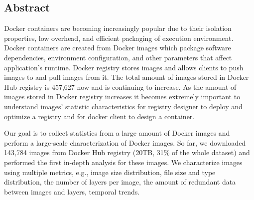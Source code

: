 \subsection*{Abstract}
Docker containers are becoming increasingly popular due to their isolation properties, low overhead, and efficient packaging of execution environment. Docker containers are created from Docker images which package software dependencies, environment configuration, and other parameters that affect application's runtime. Docker registry stores images and allows clients to push images to and pull images from it. The total amount of images stored in Docker Hub registry is 457,627 now and is continuing to increase. As the amount of images stored in Docker registry increases it becomes extremely important to understand images' statistic characteristics for registry designer to deploy and optimize a registry and for docker client to design a container.  

Our goal is to collect statistics from a large amount of Docker images and perform a large-scale characterization of Docker images. So far, we downloaded 143,784 images from Docker Hub registry (20TB, 31\% of the whole dataset) and performed the first in-depth analysis for these images. We characterize images using multiple metrics, e.g., image size distribution, file size and type distribution, the number of layers per image, the amount of redundant data between images and layers, temporal trends. 